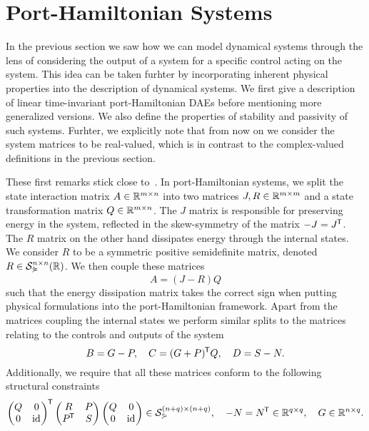 \section{Port-Hamiltonian Systems}

In the previous section we saw how we can model dynamical systems through the lens of considering the output of a system for a specific control acting on the system.
This idea can be taken furhter by incorporating inherent physical properties into the description of dynamical systems.
We first give a description of linear time-invariant port-Hamiltonian DAEs before mentioning more generalized versions.
We also define the properties of stability and passivity of such systems.
Furhter, we explicitly note that from now on we consider the system matrices to be real-valued, which is in contrast to the complex-valued definitions in the previous section.

These first remarks stick close to~\cite[Definition~4.9]{Mehrmann2022}.
In port-Hamiltonian systems, we split the state interaction matrix $A \in \mathbb{R}^{m \times n}$ into two matrices $J, R \in \mathbb{R}^{m \times m}$ and a state transformation matrix $Q \in \mathbb{R}^{m \times n}$.
The $J$ matrix is responsible for preserving energy in the system, reflected in the skew-symmetry of the matrix $-J = J^{\mkern-1.5mu \mathsf{T}}$.
The $R$ matrix on the other hand dissipates energy through the internal states.
We consider $R$ to be a symmetric positive semidefinite matrix, denoted $R \in \mathcal{S}_{\curlyeqsucc}^{n \times n}(\mathbb{R})$.
We then couple these matrices
\begin{equation*}
    A = (J - R)Q
\end{equation*}
such that the energy dissipation matrix takes the correct sign when putting physical formulations into the port-Hamiltonian framework.
Apart from the matrices coupling the internal states we perform similar splits to the matrices relating to the controls and outputs of the system
\begin{equation*}
    B = G - P,\quad C = (G + P)^{\mkern-1.5mu \mathsf{T}} Q,\quad D = S - N.
\end{equation*}
Additionally, we require that all these matrices conform to the following structural constraints
\begin{equation}\label{eq:ph-matrix-structure}
    \begin{pmatrix}
        Q & 0 \\
        0 & \text{id}_{}
    \end{pmatrix}^{\mkern-1.5mu \mathsf{T}}
    \begin{pmatrix}
        R & P \\
        P^{\mkern-1.5mu \mathsf{T}} & S
    \end{pmatrix}
    \begin{pmatrix}
        Q & 0 \\
        0 & \text{id}_{}
    \end{pmatrix}
    \in \mathcal{S}_{\curlyeqsucc}^{(n + q) \times (n + q)},\quad -N = N^{\mkern-1.5mu \mathsf{T}} \in \mathbb{R}^{q \times q},\quad G \in \mathbb{R}^{n \times q}.
\end{equation}

